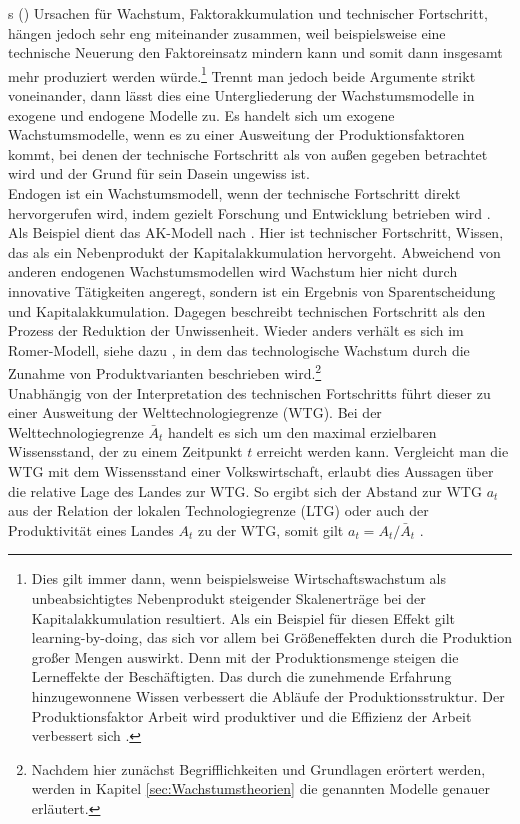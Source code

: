 %
\cite{Gandolfo.1998}s (\citeyear{Gandolfo.1998}) Ursachen für Wachstum, Faktorakkumulation und technischer Fortschritt, hängen jedoch sehr eng miteinander zusammen, weil beispielsweise eine technische Neuerung den Faktoreinsatz mindern kann und somit dann insgesamt mehr produziert werden würde.\footnote{Dies gilt immer dann, wenn beispielsweise Wirtschaftswachstum als unbeabsichtigtes Nebenprodukt steigender Skalenerträge bei der Kapitalakkumulation resultiert. Als ein Beispiel für diesen Effekt gilt learning-by-doing, das sich vor allem bei Größeneffekten durch die Produktion großer Mengen auswirkt. Denn mit der Produktionsmenge steigen die Lerneffekte der Beschäftigten. Das durch die zunehmende Erfahrung hinzugewonnene Wissen verbessert die Abläufe der Produktionsstruktur. Der Produktionsfaktor Arbeit wird produktiver und die Effizienz der Arbeit verbessert sich \cite[Kapitel 12, S.413]{Acemoglu.2009}.} Trennt man jedoch beide Argumente strikt voneinander, dann lässt dies eine Untergliederung der Wachstumsmodelle in exogene und endogene Modelle zu. Es handelt sich um exogene Wachstumsmodelle, wenn es zu einer Ausweitung der Produktionsfaktoren kommt, bei denen der technische Fortschritt als von außen gegeben betrachtet wird und der Grund für sein Dasein ungewiss ist.\\
%
Endogen ist ein Wachstumsmodell, wenn der technische Fortschritt direkt hervorgerufen wird, indem gezielt Forschung und Entwicklung betrieben wird \cite[S.269]{Gandolfo.1998}.\\
%
Als Beispiel dient das AK-Modell nach \cite{Rebelo.1991}. Hier ist technischer Fortschritt, Wissen, das als ein Nebenprodukt der Kapitalakkumulation hervorgeht. Abweichend von anderen endogenen Wachstumsmodellen wird Wachstum hier nicht durch innovative Tätigkeiten angeregt, sondern ist ein Ergebnis von Sparentscheidung und Kapitalakkumulation. Dagegen beschreibt \cite{Arrow.1969} technischen Fortschritt als den Prozess der Reduktion der Unwissenheit. Wieder anders verhält es sich im Romer-Modell, siehe dazu \cite{Romer.1990}, in dem das technologische Wachstum durch die Zunahme von Produktvarianten beschrieben wird.\footnote{Nachdem hier zunächst Begrifflichkeiten und Grundlagen erörtert werden, werden in Kapitel \ref{sec:Wachstumstheorien} die genannten Modelle genauer erläutert.}\\
%
Unabhängig von der Interpretation des technischen Fortschritts führt dieser zu einer Ausweitung der Welttechnologiegrenze (WTG). Bei der Welttechnologiegrenze $\bar{A}_t$  handelt es sich um den maximal erzielbaren Wissensstand, der zu einem Zeitpunkt $t$ erreicht werden kann. Vergleicht man die WTG mit dem Wissensstand einer Volkswirtschaft, erlaubt dies Aussagen über die relative Lage des Landes zur WTG. So ergibt sich der Abstand zur WTG $a_t$ aus der Relation der lokalen Technologiegrenze (LTG) oder auch der Produktivität eines Landes $A_t$ zu der WTG, somit gilt $a_t = A_t/\bar{A}_t$ \cite{Aghion.1992,Aghion.1998}.\\
